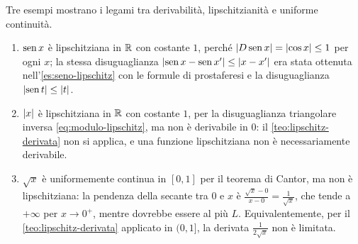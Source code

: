 \begin{esempio}\label{es:lipschitz-esempi}
Tre esempi mostrano i legami tra derivabilità, lipschitzianità e uniforme continuità.
\begin{enumerate}[label=\textup{(\alph*)}]
  \item $\operatorname{sen} x$ è lipschitziana in $\mathbb{R}$ con costante $1$, perché
  $\lvert D\operatorname{sen} x\rvert=\lvert \cos x\rvert\le1$ per ogni $x$; la stessa disuguaglianza
  $\lvert \operatorname{sen} x-\operatorname{sen} x'\rvert\le\lvert x-x'\rvert$ era stata ottenuta nell'\cref{es:seno-lipschitz}
  con le formule di prostaferesi e la disuguaglianza $\lvert \operatorname{sen} t\rvert\le\lvert t\rvert$.
  \item $\lvert x\rvert$ è lipschitziana in $\mathbb{R}$ con costante $1$, per la disuguaglianza
  triangolare inversa \eqref{eq:modulo-lipschitz}, ma non è derivabile in $0$: il
  \cref{teo:lipschitz-derivata} non si applica, e una funzione lipschitziana non è
  necessariamente derivabile.
  \item $\sqrt x$ è uniformemente continua in $[0,1]$ per il teorema di Cantor, ma non è
  lipschitziana: la pendenza della secante tra $0$ e $x$ è
  $\frac{\sqrt x-0}{x-0}=\frac1{\sqrt x}$, che tende a $+\infty$ per $x\to0^{+}$, mentre
  dovrebbe essere al più $L$. Equivalentemente, per il \cref{teo:lipschitz-derivata}
  applicato in $(0,1]$, la derivata $\frac1{2\sqrt x}$ non è limitata.
\end{enumerate}
\end{esempio}

